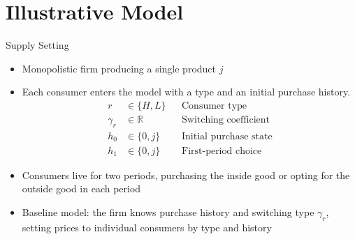 \documentclass[aspectratio=169,professionalfonts]{beamer}
\newcommand{\shortbuttons}{}
\begin{document}
\section{Illustrative Model}

\gdef\shortbuttons{}
\begin{frame}[label=short-6]{Supply Setting}
  \begin{itemize}
    \item Monopolistic firm producing a single product $j$
    \item Each consumer enters the model with a type and an initial purchase history. 
    \[
    \begin{aligned}
      r &\in \{H, L\}
        && \text{Consumer type} \\
      \gamma_r &\in \mathbb{R}
        && \text{Switching coefficient} \\
      h_0 &\in \{0, j\}
        && \text{Initial purchase state} \\
      h_1 &\in \{0, j\}
        && \text{First-period choice}
    \end{aligned}
    \]
    \item Consumers live for two periods, purchasing the inside good or opting for the outside good in each period
    \item Baseline model: the firm knows purchase history and switching type $\gamma_r$, setting prices to individual consumers by type and history
  \end{itemize}
\end{frame}
\end{document}
